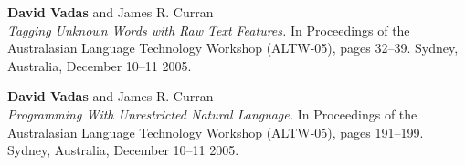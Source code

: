 \documentclass[]{article}
\begin{document}
\vbox{}

\textbf{David Vadas} and James R. Curran\\
\textit{Tagging Unknown Words with Raw Text Features.} In Proceedings of the
Australasian Language Technology Workshop (ALTW-05), pages 32--39.
Sydney, Australia, December 10--11 2005. \\  

\vbox{}

\textbf{David Vadas} and James R. Curran\\
\textit{Programming With Unrestricted Natural Language.} In Proceedings of the
Australasian Language Technology Workshop (ALTW-05), pages 191--199. 
Sydney, Australia, December 10--11 2005. \\  
 
\end{document}
